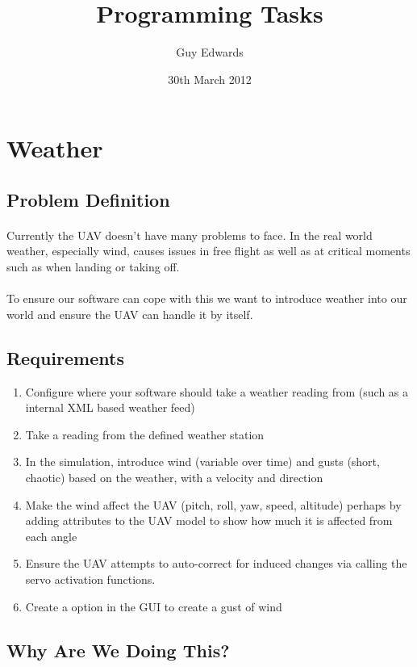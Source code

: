\documentclass[11pt]{book}
\title{\textbf{Programming Tasks}}
\author{Guy Edwards}
\date{30th March 2012}
\begin{document}
\section{Weather}

\subsection{Problem Definition}

\paragraph{} Currently the UAV doesn't have many problems to face. In the real world weather, especially wind, causes issues in free flight as well as at critical moments such as when landing or taking off.

\paragraph{} To ensure our software can cope with this we want to introduce weather into our world and ensure the UAV can handle it by itself.

\subsection{Requirements}

\begin{enumerate}
\item{} Configure where your software should take a weather reading from (such as a internal XML based weather feed)
\item{} Take a reading from the defined weather station
\item{} In the simulation, introduce wind (variable over time) and gusts (short, chaotic) based on the weather, with a velocity and direction
\item{} Make the wind affect the UAV (pitch, roll, yaw, speed, altitude) perhaps by adding attributes to the UAV model to show how much it is affected from each angle
\item{} Ensure the UAV attempts to auto-correct for induced changes via calling the servo activation functions.
\item{} Create a option in the GUI to create a gust of wind
\end{enumerate}

\subsection{Why Are We Doing This?}
\end{document}
